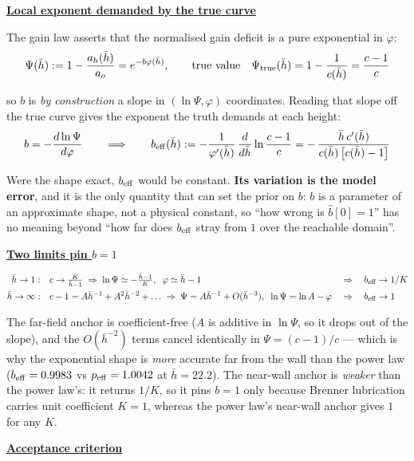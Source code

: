 \documentclass[11pt,a4paper,fontset=none]{ctexart}
\newcommand{\hbn}{\bar h}
\newcommand{\ao}{a_{o}}
\newcommand{\hd}[1]{\par\smallskip\noindent\underline{\textbf{#1}}\par\nobreak\vspace{0.1ex}}
\begin{document}
\hd{Local exponent demanded by the true curve}

The gain law asserts that the normalised gain deficit is a pure exponential in $\varphi$:
\[ \Psi(\hbn) := 1 - \frac{a_h(\hbn)}{\ao} = e^{-b\varphi(\hbn)},
   \qquad\text{true value}\quad
   \Psi_{\rm true}(\hbn) = 1 - \frac{1}{c(\hbn)} = \frac{c-1}{c} \]

so $b$ is \emph{by construction} a slope in $(\ln\Psi,\varphi)$ coordinates. Reading that
slope off the true curve gives the exponent the truth demands at each height:
\[ b = -\frac{d\ln\Psi}{d\varphi}
   \qquad\Longrightarrow\qquad
   b_{\rm eff}(\hbn) := -\frac{1}{\varphi'(\hbn)}\,\frac{d}{d\hbn}\ln\frac{c-1}{c}
   = -\,\frac{\hbn\,c'(\hbn)}{c(\hbn)\,\big[c(\hbn)-1\big]} \]

Were the shape exact, $b_{\rm eff}$ would be constant. \textbf{Its variation is the model
error}, and it is the only quantity that can set the prior on $b$: $b$ is a parameter of an
approximate shape, not a physical constant, so ``how wrong is $\hat b[0]=1$'' has no meaning
beyond ``how far does $b_{\rm eff}$ stray from $1$ over the reachable domain''.

\hd{Two limits pin $b = 1$} 
\[
\begin{aligned}
\hbn\to1:&\quad c \to \tfrac{K}{\hbn-1} \;\Rightarrow\; \ln\Psi \simeq -\tfrac{\hbn-1}{K},
  \;\; \varphi \simeq \hbn-1 &&\Rightarrow\quad b_{\rm eff} \to 1/K \\
\hbn\to\infty:&\quad c-1 = A\hbn^{-1}+A^2\hbn^{-2}+\dots \;\Rightarrow\; \Psi = A\hbn^{-1}+O(\hbn^{-3}),
  \;\; \ln\Psi = \ln A - \varphi &&\Rightarrow\quad b_{\rm eff} \to 1
\end{aligned}
\]

The far-field anchor is coefficient-free ($A$ is additive in $\ln\Psi$, so it drops out of the
slope), and the $O(\hbn^{-2})$ terms cancel identically in $\Psi=(c-1)/c$ --- which is why the
exponential shape is \emph{more} accurate far from the wall than the power law
($b_{\rm eff}=0.9983$ vs $p_{\rm eff}=1.0042$ at $\hbn=22.2$). The near-wall anchor is
\emph{weaker} than the power law's: it returns $1/K$, so it pins $b=1$ only because Brenner
lubrication carries unit coefficient $K=1$, whereas the power law's near-wall anchor gives $1$
for any $K$.

\hd{Acceptance criterion} 
\end{document}
